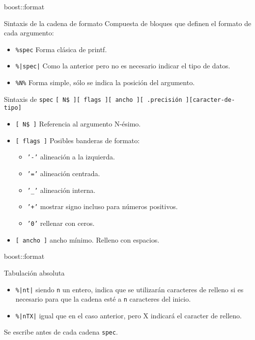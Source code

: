 \documentclass[8pt,xcolor=svgnames]{beamer}
\begin{document}
\begin{frame}{boost::format}
  \begin{block}{Sintaxis de la cadena de formato}
    Compuesta de bloques que definen el formato de cada argumento:
    \begin{itemize}
    \item \texttt{\%spec} Forma clásica de printf.
    \item \texttt{\%|spec|}  Como la anterior pero no es necesario indicar el tipo de datos.
    \item \texttt{\%N\%} Forma simple, sólo se indica la posición del argumento.
    \end{itemize}    
  \end{block}

  \begin{block}{Sintaxis de \texttt{spec}}
    \texttt{[ N\$ ][ flags ][ ancho ][ .precisión ][caracter-de-tipo]}    
    \begin{itemize}
    \item \texttt{[ N\$ ]} Referencia al argumento N-ésimo.
    \item \texttt{[ flags ]} Posibles banderas de formato:
      {\scriptsize
        \begin{itemize}
        \item \texttt{'-'}  alineación a la izquierda.
        \item \texttt{'='}  alineación centrada.
        \item \texttt{'\_'}  alineación interna.
        \item \texttt{'+'}  mostrar signo incluso para números positivos.
        \item \texttt{'0'}  rellenar con ceros.
        \end{itemize}
      }
    \item \texttt{[ ancho ]} ancho mínimo. Relleno con espacios.
    \end{itemize}
  \end{block}
\end{frame}

\begin{frame}[fragile]{boost::format}
  \begin{block}{Tabulación absoluta}
    \begin{itemize}
    \item \texttt{\%|nt|} siendo \texttt{n} un entero, indica que se
      utilizarán caracteres de relleno si es necesario para que la cadena
      esté a \texttt{n} caracteres del inicio.
    \item \texttt{\%|nTX|} igual que en el caso anterior, pero X indicará
      el caracter de relleno.
    \end{itemize} 
    Se escribe antes de cada cadena \texttt{spec}.
  \end{block}
\end{frame}
\end{document}
